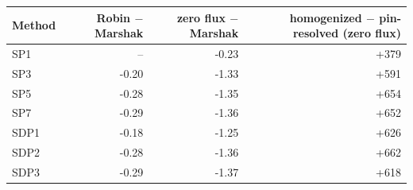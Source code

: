 \begin{tabular}{lrrr}
\hline
Method & Robin $-$ Marshak & zero flux $-$ Marshak & homogenized $-$ pin-resolved (zero flux) \\
\hline
SP1 & -- & -0.23 & +379 \\
SP3 & -0.20 & -1.33 & +591 \\
SP5 & -0.28 & -1.35 & +654 \\
SP7 & -0.29 & -1.36 & +652 \\
SDP1 & -0.18 & -1.25 & +626 \\
SDP2 & -0.28 & -1.36 & +662 \\
SDP3 & -0.29 & -1.37 & +618 \\
\hline
\end{tabular}
